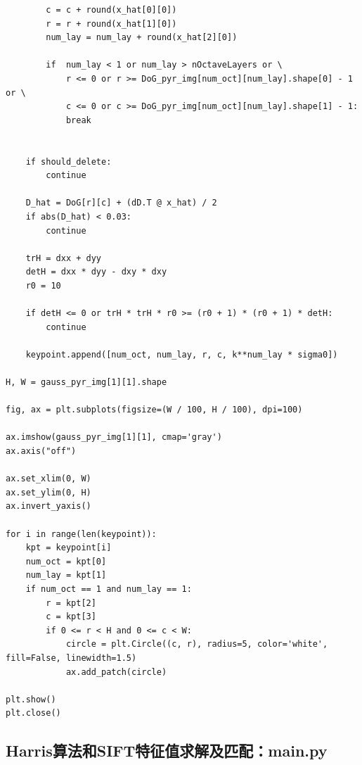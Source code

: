 \documentclass{article}
\begin{document}
\begin{lstlisting}
        c = c + round(x_hat[0][0])
        r = r + round(x_hat[1][0])
        num_lay = num_lay + round(x_hat[2][0])

        if  num_lay < 1 or num_lay > nOctaveLayers or \
            r <= 0 or r >= DoG_pyr_img[num_oct][num_lay].shape[0] - 1 or \
            c <= 0 or c >= DoG_pyr_img[num_oct][num_lay].shape[1] - 1:
            break


    if should_delete:
        continue

    D_hat = DoG[r][c] + (dD.T @ x_hat) / 2
    if abs(D_hat) < 0.03:
        continue

    trH = dxx + dyy
    detH = dxx * dyy - dxy * dxy
    r0 = 10

    if detH <= 0 or trH * trH * r0 >= (r0 + 1) * (r0 + 1) * detH:
        continue

    keypoint.append([num_oct, num_lay, r, c, k**num_lay * sigma0])

H, W = gauss_pyr_img[1][1].shape

fig, ax = plt.subplots(figsize=(W / 100, H / 100), dpi=100)

ax.imshow(gauss_pyr_img[1][1], cmap='gray')
ax.axis("off")

ax.set_xlim(0, W)
ax.set_ylim(0, H)
ax.invert_yaxis()

for i in range(len(keypoint)):
    kpt = keypoint[i]
    num_oct = kpt[0]
    num_lay = kpt[1]
    if num_oct == 1 and num_lay == 1:
        r = kpt[2]
        c = kpt[3]
        if 0 <= r < H and 0 <= c < W:
            circle = plt.Circle((c, r), radius=5, color='white', fill=False, linewidth=1.5)
            ax.add_patch(circle)

plt.show()
plt.close()
\end{lstlisting}

\subsection{Harris算法和SIFT特征值求解及匹配：main.py}
\end{document}
